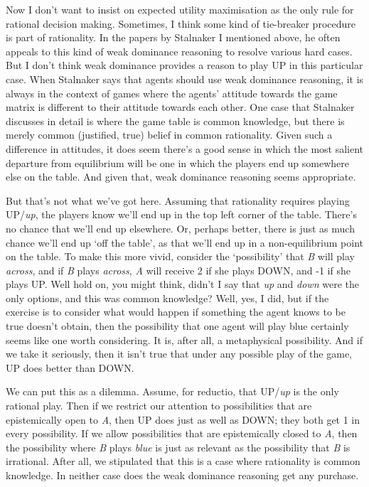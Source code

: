 \documentclass[
  11pt,
]{book}
\begin{document}
Now I don't want to insist on expected utility maximisation as the only rule for rational decision making. Sometimes, I think some kind of tie-breaker procedure is part of rationality. In the papers by Stalnaker I mentioned above, he often appeals to this kind of weak dominance reasoning to resolve various hard cases. But I don't think weak dominance provides a reason to play UP in this particular case. When Stalnaker says that agents should use weak dominance reasoning, it is always in the context of games where the agents' attitude towards the game matrix is different to their attitude towards each other. One case that Stalnaker discusses in detail is where the game table is common knowledge, but there is merely common (justified, true) belief in common rationality. Given such a difference in attitudes, it does seem there's a good sense in which the most salient departure from equilibrium will be one in which the players end up somewhere else on the table. And given that, weak dominance reasoning seems appropriate.

But that's not what we've got here. Assuming that rationality requires playing UP/\emph{up}, the players know we'll end up in the top left corner of the table. There's no chance that we'll end up elsewhere. Or, perhaps better, there is just as much chance we'll end up `off the table', as that we'll end up in a non-equilibrium point on the table. To make this more vivid, consider the `possibility' that \emph{B} will play \emph{across}, and if \emph{B} plays \emph{across}, \emph{A} will receive 2 if she plays DOWN, and -1 if she plays UP. Well hold on, you might think, didn't I say that \emph{up} and \emph{down} were the only options, and this was common knowledge? Well, yes, I did, but if the exercise is to consider what would happen if something the agent knows to be true doesn't obtain, then the possibility that one agent will play blue certainly seems like one worth considering. It is, after all, a metaphysical possibility. And if we take it seriously, then it isn't true that under any possible play of the game, UP does better than DOWN.

We can put this as a dilemma. Assume, for reductio, that UP/\emph{up} is the only rational play. Then if we restrict our attention to possibilities that are epistemically open to \emph{A}, then UP does just as well as DOWN; they both get 1 in every possibility. If we allow possibilities that are epistemically closed to \emph{A}, then the possibility where \emph{B} plays \emph{blue} is just as relevant as the possibility that \emph{B} is irrational. After all, we stipulated that this is a case where rationality is common knowledge. In neither case does the weak dominance reasoning get any purchase.
\end{document}
